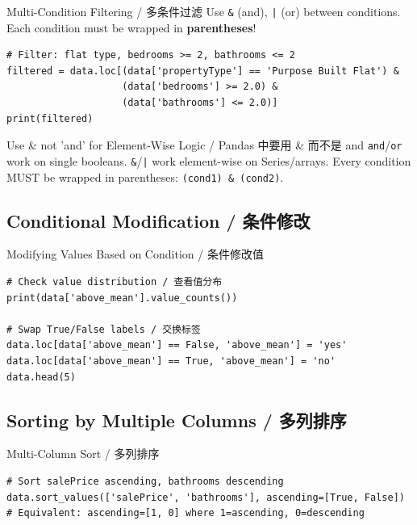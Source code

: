 \documentclass[11pt,a4paper]{article}
\begin{document}
\begin{examplebox}{Multi-Condition Filtering / 多条件过滤}
    Use \texttt{\&} (and), \texttt{|} (or) between conditions. Each condition must be wrapped in \textbf{parentheses}!
\begin{lstlisting}
# Filter: flat type, bedrooms >= 2, bathrooms <= 2
filtered = data.loc[(data['propertyType'] == 'Purpose Built Flat') &
                    (data['bedrooms'] >= 2.0) &
                    (data['bathrooms'] <= 2.0)]
print(filtered)
\end{lstlisting}
\end{examplebox}

\begin{warning}{Use \& not 'and' for Element-Wise Logic / Pandas 中要用 \& 而不是 and}
    \texttt{and}/\texttt{or} work on single booleans. \texttt{\&}/\texttt{|} work element-wise on Series/arrays. Every condition MUST be wrapped in parentheses: \texttt{(cond1) \& (cond2)}.
\end{warning}

\subsection{Conditional Modification / 条件修改}

\begin{examplebox}{Modifying Values Based on Condition / 条件修改值}
\begin{lstlisting}
# Check value distribution / 查看值分布
print(data['above_mean'].value_counts())

# Swap True/False labels / 交换标签
data.loc[data['above_mean'] == False, 'above_mean'] = 'yes'
data.loc[data['above_mean'] == True, 'above_mean'] = 'no'
data.head(5)
\end{lstlisting}
\end{examplebox}

\subsection{Sorting by Multiple Columns / 多列排序}

\begin{examplebox}{Multi-Column Sort / 多列排序}
\begin{lstlisting}
# Sort salePrice ascending, bathrooms descending
data.sort_values(['salePrice', 'bathrooms'], ascending=[True, False])
# Equivalent: ascending=[1, 0] where 1=ascending, 0=descending
\end{lstlisting}
\end{examplebox}
\end{document}
